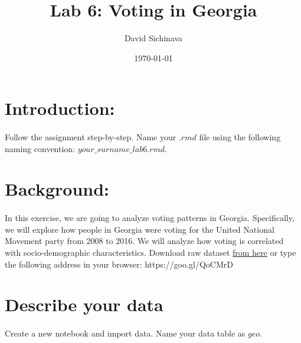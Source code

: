 \documentclass{article}\usepackage[]{graphicx}\usepackage[]{color}
\title{Lab 6: Voting in Georgia}
\author{David Sichinava}
\date{\today}
\begin{document}
\maketitle

\section*{Introduction:}

\paragraph{}
Follow the assignment step-by-step. Name your $.rmd$ file using the following naming convention: $your\_surname\_lab6.rmd$. 

\section*{Background:}
\paragraph{}

In this exercise, we are going to analyze voting patterns in Georgia. Specifically, we will explore how people in Georgia were voting for the United National Movement party from 2008 to 2016. We will analyze how voting is correlated with socio-demographic characteristics.
Download raw dataset  \href{https://goo.gl/QoCMrD}{from here} or type the following address in your browser: https://goo.gl/QoCMrD

\section*{Describe your data}
\paragraph{}

Create a new notebook and import data. Name your data table as $geo$.
\end{document}
